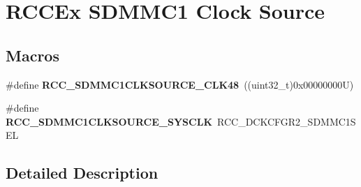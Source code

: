 \hypertarget{group___r_c_c_ex___s_d_m_m_c1___clock___source}{}\section{R\+C\+C\+Ex S\+D\+M\+M\+C1 Clock Source}
\label{group___r_c_c_ex___s_d_m_m_c1___clock___source}
\subsection*{Macros}
\begin{DoxyCompactItemize}
\item 
\mbox{\label{group___r_c_c_ex___s_d_m_m_c1___clock___source_ga81222c2a958eb074fd79dce5650e5742}} 
\#define {\bfseries R\+C\+C\+\_\+\+S\+D\+M\+M\+C1\+C\+L\+K\+S\+O\+U\+R\+C\+E\+\_\+\+C\+L\+K48}~((uint32\+\_\+t)0x00000000\+U)
\item 
\mbox{\label{group___r_c_c_ex___s_d_m_m_c1___clock___source_ga88caf00e619ba2e5dc55a346ff8dbccb}} 
\#define {\bfseries R\+C\+C\+\_\+\+S\+D\+M\+M\+C1\+C\+L\+K\+S\+O\+U\+R\+C\+E\+\_\+\+S\+Y\+S\+C\+LK}~R\+C\+C\+\_\+\+D\+C\+K\+C\+F\+G\+R2\+\_\+\+S\+D\+M\+M\+C1\+S\+EL
\end{DoxyCompactItemize}


\subsection{Detailed Description}
